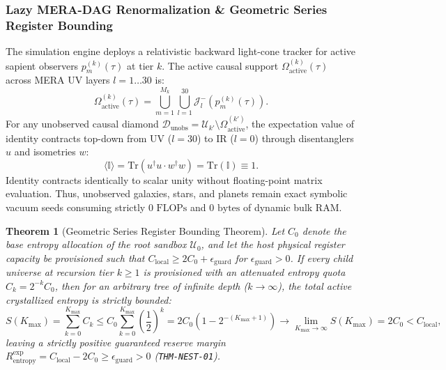 \documentclass[11pt,onecolumn]{article}
\newtheorem{theorem}{Theorem}
\begin{document}
\subsubsection{Lazy MERA-DAG Renormalization \& Geometric Series Register Bounding}
The simulation engine deploys a relativistic backward light-cone tracker for active sapient observers $p_m^{(k)}(\tau)$ at tier $k$. The active causal support $\Omega_{\text{active}}^{(k)}(\tau)$ across MERA UV layers $l = 1\dots 30$ is:
\begin{equation}
\Omega_{\text{active}}^{(k)}(\tau) = \bigcup_{m=1}^{M_k} \bigcup_{l=1}^{30} \mathcal{J}_l^-(p_m^{(k)}(\tau)).
\end{equation}
For any unobserved causal diamond $\mathcal{D}_{\text{unobs}} = \mathcal{U}_{k'} \setminus \Omega_{\text{active}}^{(k')}$, the expectation value of identity contracts top-down from UV ($l=30$) to IR ($l=0$) through disentanglers $u$ and isometries $w$:
\begin{equation}
\langle \mathbb{I} \rangle = \mathrm{Tr}\left( u^\dagger u \cdot w^\dagger w \right) = \mathrm{Tr}(\mathbb{I}) \equiv 1.
\end{equation}
Identity contracts identically to scalar unity without floating-point matrix evaluation. Thus, unobserved galaxies, stars, and planets remain exact symbolic vacuum seeds consuming strictly $0\text{ FLOPs}$ and $0\text{ bytes}$ of dynamic bulk RAM.

\begin{theorem}[Geometric Series Register Bounding Theorem]
\label{thm:geometric_bounding}
Let $C_0$ denote the base entropy allocation of the root sandbox $\mathcal{U}_0$, and let the host physical register capacity be provisioned such that $C_{\text{local}} \ge 2 C_0 + \epsilon_{\text{guard}}$ for $\epsilon_{\text{guard}} > 0$. If every child universe at recursion tier $k \ge 1$ is provisioned with an attenuated entropy quota $C_k = 2^{-k} C_0$, then for an arbitrary tree of infinite depth ($k \to \infty$), the total active crystallized entropy is strictly bounded:
\begin{equation}
S(K_{\max}) = \sum_{k=0}^{K_{\max}} C_k \le C_0 \sum_{k=0}^{K_{\max}} \left(\frac{1}{2}\right)^k = 2C_0 \left(1 - 2^{-(K_{\max}+1)}\right) \longrightarrow \lim_{K_{\max}\to\infty} S(K_{\max}) = 2C_0 < C_{\text{local}},
\end{equation}
leaving a strictly positive guaranteed reserve margin $R_{\text{entropy}}^{\text{exp}} = C_{\text{local}} - 2 C_0 \ge \epsilon_{\text{guard}} > 0$ (\texttt{THM-NEST-01}).
\end{theorem}
\end{document}
